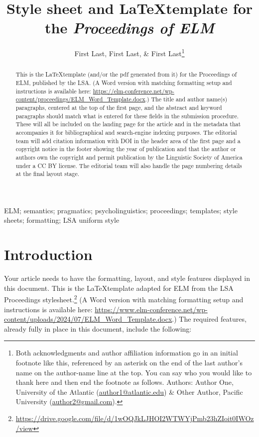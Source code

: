 \documentclass[12pt,letterpaper]{article}
\title{Style sheet and \LaTeX template for the \textit{Proceedings of ELM}}
\author{First Last, First Last, \& First Last\footnote{Both acknowledgments and author affiliation information go in an initial footnote like this, referenced by an asterisk on the end of the last author's name on the author-name line at the top. You can say who you would like to thank here and then end the footnote as follows. Authors: Author One, University of the Atlantic (\href{mailto:author1@atlantic.edu}{author1@atlantic.edu}) \& Other Author, Pacific University (\href{mailto:author2@gmail.com}{author2@gmail.com}).}}
\begin{document}
 

\setlength{\Extopsep}{6pt}
\setlength{\Exlabelsep}{6.75pt}		%
 
\maketitle
\thispagestyle{empty}
\begin{abstract}
This is the \LaTeX template (and/or the pdf generated from it) for the Proceedings of ELM, published by the LSA. (A Word version with matching formatting setup and instructions is available here: \url{https://elm-conference.net/wp-content/proceedings/ELM_Word_Template.docx}.) The title and author name(s) paragraphs, centered at the top of the first page, and the abstract and keyword paragraphs should match what is entered for these fields in the submission procedure. These will all be included on the landing page for the article and in the metadata that accompanies it for bibliographical and search-engine indexing purposes. The editorial team will add citation information with DOI in the header area of the first page and a copyright notice in the footer showing the year of publication and that the author or authors own the copyright and permit publication by the Linguistic Society of America under a CC BY license. The editorial team will also handle the page numbering details at the final layout stage.
\end{abstract}

\begin{keywords} %
ELM; semantics; pragmatics; psycholinguistics; proceedings; templates; style sheets; formatting; LSA uniform style
\end{keywords}

\vspace{6pt} %


\section{Introduction} %
Your article needs to have the formatting, layout, and style features displayed in this document. This is the \LaTeX template adapted for ELM from the LSA Proceedings stylesheet.\footnote{\url{https://drive.google.com/file/d/1wOQJkLJHOI2WTWYjPmb23hZIoit0IWOz/view}} (A Word version with matching formatting setup and instructions is available here: \url{https://www.elm-conference.net/wp-content/uploads/2024/07/ELM_Word_Template.docx}.) The required features, already fully in place in this document, include the following:
\end{document}

